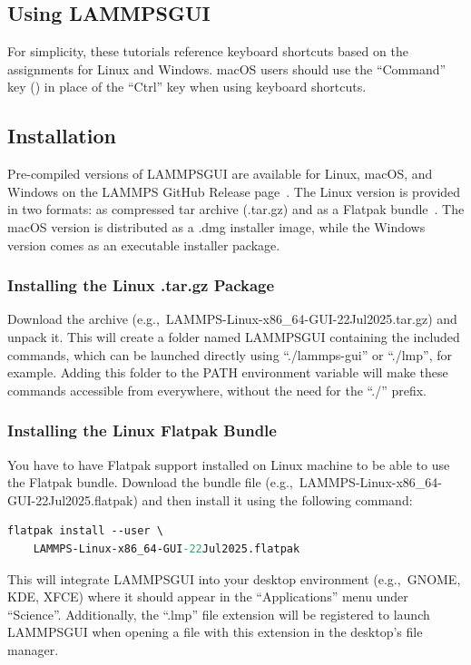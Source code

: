 \documentclass[9pt,tutorial]{livecoms}
\newcommand{\lammpsgui}{\textsf{LAMMPS\textendash GUI}}
\begin{document}
\begin{appendices}
\section{Using \lammpsgui{}}
\label{using-lammps-gui-label}

\begin{note}
  For simplicity, these tutorials reference keyboard shortcuts
  based on the assignments for Linux and Windows.  {macOS} users should
  use the ``Command'' key (\cmd) in place of the
  ``Ctrl'' key when using keyboard shortcuts.
\end{note}

\subsection{Installation}

Pre-compiled versions of \lammpsgui{} are available for Linux, {macOS},
and Windows on the LAMMPS GitHub Release
page~\cite{lammps_github_release}.  The Linux version is provided in two
formats: as compressed tar archive (.tar.gz) and as a Flatpak
bundle~\cite{flatpak_home}.  The {macOS} version is distributed as a
.dmg installer image, while the Windows version comes as an executable
installer package.

\subsubsection{Installing the Linux .tar.gz Package}

Download the archive (e.g.,~LAMMPS-Linux-x86\_64-GUI-22Jul2025.tar.gz)
and unpack it.  This will create a folder named \lammpsgui{} containing the
included commands, which can be launched directly using ``./lammps-gui'' or
``./lmp'', for example.  Adding this folder to the PATH environment
variable will make these commands accessible from everywhere, without the
need for the ``./'' prefix.

\subsubsection{Installing the Linux Flatpak Bundle}

You have to have Flatpak support installed on Linux machine to be able
to use the Flatpak bundle.  Download the bundle file
(e.g.,~LAMMPS-Linux-x86\_64-GUI-22Jul2025.flatpak) and then
install it using the following command:
\begin{lstlisting}[language=tcl]
flatpak install --user \
    LAMMPS-Linux-x86_64-GUI-22Jul2025.flatpak
\end{lstlisting}
This will integrate \lammpsgui{} into your desktop environment
(e.g.,~GNOME, KDE, XFCE) where it should appear in the ``Applications''
menu under ``Science''.  Additionally, the ``.lmp'' file extension will be
registered to launch \lammpsgui{} when opening a file with this
extension in the desktop's file manager.


\end{appendices}
\end{document}
